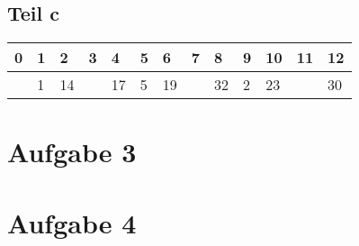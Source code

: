 \documentclass[10pt,a4paper]{article}
\begin{document}
\subsection{Teil c}
\begin{tabular}{l|l|l|l|l|l|l|l|l|l|l|l|l}
  0 & 1 & 2 & 3 & 4 & 5 & 6 & 7 & 8 & 9 & 10 & 11 & 12\\
  \hline
    & 1 & 14 &   & 17 & 5 & 19 &   & 32 & 2 & 23 &  & 30
\end{tabular}

\section{Aufgabe 3}

\section{Aufgabe 4}
\end{document}
